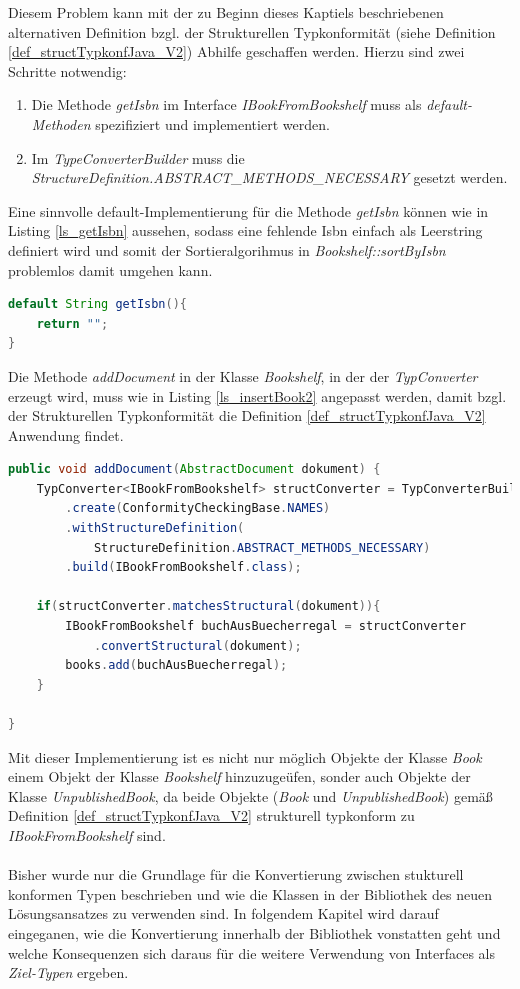 \documentclass[11pt, 
ngerman,
doublespacing,
chapterinoneline, %
consistentlayout, %
]{scrartcl}
\begin{document}
Diesem Problem kann mit der zu Beginn dieses Kaptiels beschriebenen alternativen Definition bzgl. der Strukturellen Typkonformität (siehe Definition \ref{def_structTypkonfJava_V2}) Abhilfe geschaffen werden. Hierzu sind zwei Schritte notwendig:
\begin{enumerate}
\item Die Methode \emph{getIsbn} im Interface \emph{IBookFromBookshelf} muss als \emph{default-Methoden} spezifiziert und implementiert werden.
\item Im \emph{TypeConverterBuilder} muss die \emph{StructureDefinition.ABSTRACT\_METHODS\_NECESSARY} gesetzt werden.
\end{enumerate}
Eine sinnvolle default-Implementierung für die Methode \emph{getIsbn} können wie in Listing \ref{ls_getIsbn} aussehen, sodass eine fehlende Isbn einfach als Leerstring definiert wird und somit der Sortieralgorihmus in \emph{Bookshelf::sortByIsbn} problemlos damit umgehen kann.
\begin{lstlisting}[language=Java, label=ls_getIsbn, caption=Default-Implementierung getIsbn]
default String getIsbn(){
	return "";
}
\end{lstlisting}
Die Methode \emph{addDocument} in der Klasse \emph{Bookshelf}, in der der \emph{TypConverter} erzeugt wird, muss wie in Listing \ref{ls_insertBook2} angepasst werden, damit bzgl. der Strukturellen Typkonformität die Definition \ref{def_structTypkonfJava_V2} Anwendung findet.
\begin{lstlisting}[language=Java, label=ls_insertBook2, caption=addDocument]
public void addDocument(AbstractDocument dokument) {
	TypConverter<IBookFromBookshelf> structConverter = TypConverterBuilder
		.create(ConformityCheckingBase.NAMES)
		.withStructureDefinition(
			StructureDefinition.ABSTRACT_METHODS_NECESSARY)
		.build(IBookFromBookshelf.class);

	if(structConverter.matchesStructural(dokument)){
		IBookFromBookshelf buchAusBuecherregal = structConverter
			.convertStructural(dokument);
		books.add(buchAusBuecherregal);
	}	
	
}
\end{lstlisting}
Mit dieser Implementierung ist es nicht nur möglich Objekte der Klasse \emph{Book} einem Objekt der Klasse \emph{Bookshelf} hinzuzugeüfen, sonder auch Objekte der Klasse \emph{UnpublishedBook}, da beide Objekte (\emph{Book} und \emph{UnpublishedBook}) gemäß Definition \ref{def_structTypkonfJava_V2} strukturell typkonform zu \emph{IBookFromBookshelf} sind.\\\\
Bisher wurde nur die Grundlage für die Konvertierung zwischen stukturell konformen Typen beschrieben und wie die Klassen in der Bibliothek des neuen Lösungsansatzes zu verwenden sind. In folgendem Kapitel wird darauf eingeganen, wie die Konvertierung innerhalb der Bibliothek vonstatten geht und welche Konsequenzen sich daraus für die weitere Verwendung von Interfaces als \emph{Ziel-Typen} ergeben.
\end{document}
